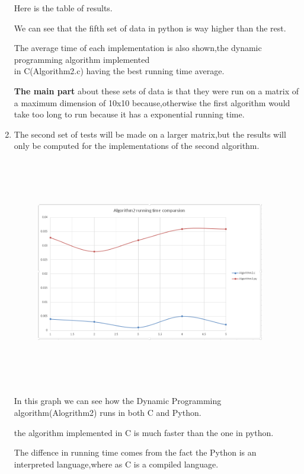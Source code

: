 \documentclass{article}
\begin{document}
\begin{enumerate}
\begin{figure}[h]
\end{figure}
\par Here is the table of results.
\par We can see that the fifth set of data in python is way higher than the rest.
\par The average time of each implementation is also shown,the dynamic programming algorithm implemented \\in C(Algorithm2.c) having the best running time average. 
\par \textbf{The main part} about these sets of data is that they were run on a matrix of a maximum dimension of 10x10 because,otherwise the first algorithm would take too long to run because it has a exponential running time.
\newpage 
\item
\par The second set of tests will be made on a larger matrix,but the 
results will only be computed for the implementations of the second algorithm.
\begin{figure}[h]
\includegraphics[width=10cm, height=10cm]{graphalg2}
\end{figure}
\par In this graph we can see how the Dynamic Programming algorithm(Alogrithm2) runs in both C and Python.
\par the algorithm implemented in C is much faster than the one in python.
\par The diffence in running time comes from the fact the Python is an interpreted language,where as C is a compiled language.
\newpage

\end{enumerate}
\end{document}
